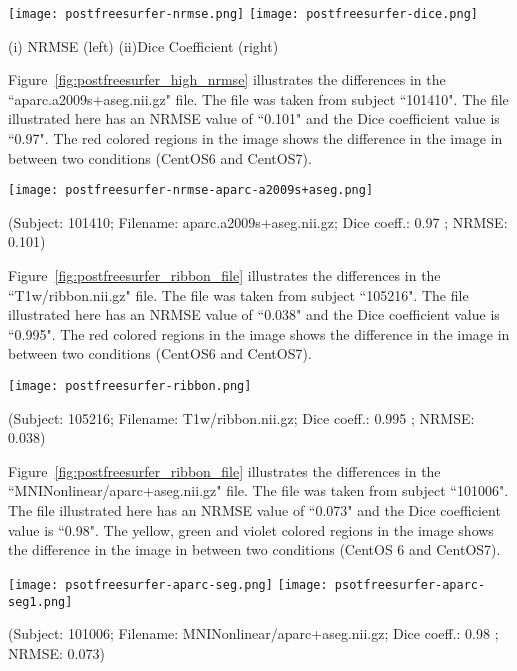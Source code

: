 \hfill \break
\begin{center}
\texttt{[image: postfreesurfer-nrmse.png]}%
\texttt{[image: postfreesurfer-dice.png]}
\caption*{(i) NRMSE (left) (ii)Dice Coefficient (right)}
\label{fig:postfreesurfer_metric_values}
\end{center}
\hfill \break

Figure~\ref{fig:postfreesurfer_high_nrmse} illustrates the differences in the ``aparc.a2009s+aseg.nii.gz" file. The file was taken from subject ``101410". The file illustrated here has an NRMSE value of ``0.101" and the Dice coefficient value is ``0.97". The red colored regions in the image shows the difference in the image in between two conditions (CentOS6 and CentOS7).

\hfill \break
\begin{center}
\texttt{[image: postfreesurfer-nrmse-aparc-a2009s+aseg.png]}
\caption*{(Subject: 101410; Filename: aparc.a2009s+aseg.nii.gz; Dice coeff.: 0.97 ; NRMSE: 0.101)}
\label{fig:postfreesurfer_high_nrmse}
\end{center}
\hfill \break

Figure~\ref{fig:postfreesurfer_ribbon_file} illustrates the differences in the ``T1w/ribbon.nii.gz" file. The file was taken from subject ``105216". The file illustrated here has an NRMSE value of ``0.038" and the Dice coefficient value is ``0.995". The red colored regions in the image shows the difference in the image in between two conditions (CentOS6 and CentOS7).

\hfill \break
\begin{center}
\texttt{[image: postfreesurfer-ribbon.png]}
\caption*{(Subject: 105216; Filename: T1w/ribbon.nii.gz; Dice coeff.: 0.995 ; NRMSE: 0.038)}
\label{fig:postfreesurfer_ribbon_file}
\end{center}
\hfill \break

Figure~\ref{fig:postfreesurfer_ribbon_file} illustrates the differences in the ``MNINonlinear/aparc+aseg.nii.gz" file. The file was taken from subject ``101006". The file illustrated here has an NRMSE value of ``0.073" and the Dice coefficient value is ``0.98". The yellow, green and violet colored regions in the image shows the difference in the image in between two conditions (CentOS 6 and CentOS7).
\hfill \break
\begin{center}
\texttt{[image: psotfreesurfer-aparc-seg.png]}%
\texttt{[image: psotfreesurfer-aparc-seg1.png]}
\caption*{(Subject: 101006; Filename: MNINonlinear/aparc+aseg.nii.gz; Dice coeff.: 0.98 ; NRMSE: 0.073)}
\label{fig:postfreesurfer_ribbon_file}
\end{center}
\hfill \break

